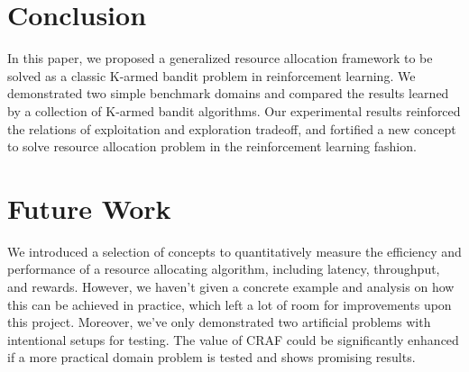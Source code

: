 \documentclass[conference]{IEEEtran}
\begin{document}
\newpage







\section{Conclusion}
In this paper, we proposed a generalized resource allocation framework to be solved as a classic K-armed bandit problem in reinforcement learning. We demonstrated two simple benchmark domains and compared the results learned by a collection of K-armed bandit algorithms. Our experimental results reinforced the relations of exploitation and exploration tradeoff, and fortified a new concept to solve resource allocation problem in the reinforcement learning fashion.

\section{Future Work}
We introduced a selection of concepts to quantitatively measure the efficiency and performance of a resource allocating algorithm, including latency, throughput, and rewards. However, we haven't given a concrete example and analysis on how this can be achieved in practice, which left a lot of room for improvements upon this project. Moreover, we've only demonstrated two artificial problems with intentional setups for testing. The value of CRAF could be significantly enhanced if a more practical domain problem is tested and shows promising results.
\end{document}
